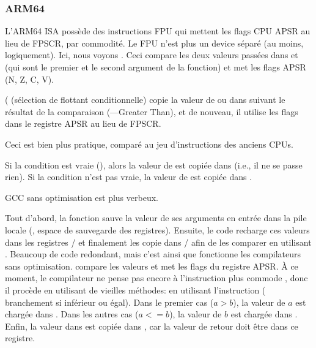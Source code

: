 \subsubsection{ARM64}




L'ARM64 \ac{ISA} possède des instructions FPU qui mettent les flags CPU \ac{APSR}
au lieu de \ac{FPSCR}, par commodité.
Le \ac{FPU} n'est plus un device séparé (au moins, logiquement).
Ici, nous voyons . Ceci compare les deux valeurs passées dans 
et  (qui sont le premier et le second argument de la fonction) et met les
flags \ac{APSR} (N, Z, C, V).

 ( (sélection de flottant conditionnelle)
copie la valeur de  ou  dans  suivant le résultat de la comparaison
(---Greater Than), et de nouveau, il utilise les flags dans le registre \ac{APSR}
au lieu de \ac{FPSCR}.

Ceci est bien plus pratique, comparé au jeu d'instructions des anciens CPUs.

Si la condition est vraie (), alors la valeur de  est copiée dans
 (i.e., il ne se passe rien).
Si la condition n'est pas vraie, la valeur de  est copiée dans .




GCC sans optimisation est plus verbeux.

Tout d'abord, la fonction sauve la valeur de ses arguments en entrée dans la pile
locale (, espace de sauvegarde des registres).
Ensuite, le code recharge ces valeurs dans les registres / et finalement
les copie dans / afin de les comparer en utilisant .
Beaucoup de code redondant, mais c'est ainsi que fonctionne les compilateurs sans
optimisation.
 compare les valeurs et met les flags du registre \ac{APSR}.
À ce moment, le compilateur ne pense pas encore à l'instruction plus commode ,
donc il procède en utilisant de vieilles méthodes:
en utilisant l'instruction  ( branchement si
inférieur ou égal).
Dans le premier cas ($a>b$), la valeur de $a$ est chargée dans .
Dans les autres cas ($a<=b$), la valeur de $b$ est chargée dans .
Enfin, la valeur dans  est copiée dans , car la valeur de retour
doit être dans ce registre.

